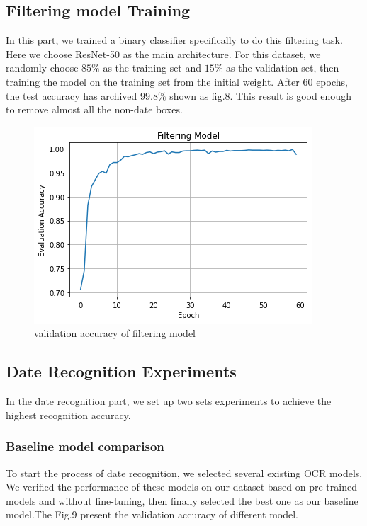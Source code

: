 \documentclass{article}
\begin{document}
\subsection{Filtering model Training}

In this part, we trained a binary classifier specifically to do this filtering task. Here we choose ResNet-50 as the main architecture. For this dataset, we randomly choose $85\%$ as the training set and $15\%$ as the validation set, then training the model on the training set from the initial weight. After 60 epochs, the test accuracy has archived $99.8\%$ shown as fig.8. This result is good enough to remove almost all the non-date boxes.

\begin{figure}[ht] \centering    
	\label{filtering model}     
	\includegraphics[width=0.8\columnwidth]{filtering model.png}  
	\caption{validation accuracy of filtering model}
\end{figure}

\subsection{Date Recognition Experiments}

In the date recognition part, we set up two sets experiments to achieve the highest recognition accuracy.

\subsubsection{Baseline model comparison}

To start the process of date recognition, we selected several existing OCR models. We verified the performance of these models on our dataset based on pre-trained models and without fine-tuning, then finally selected the best one as our baseline model.The Fig.9 present the validation accuracy of different model.
\end{document}
